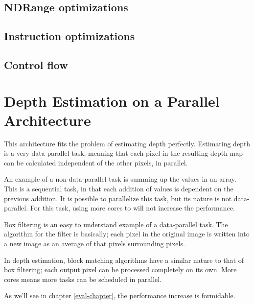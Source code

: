 \subsection{NDRange optimizations}
\label{sect:ndrange-optimization}



\subsection{Instruction optimizations}
\label{sect:instruction-optimization}

\subsection{Control flow}
\label{sect:control-flow}

\section{Depth Estimation on a Parallel Architecture}

This architecture fits the problem of estimating depth perfectly.
Estimating depth is a very data-parallel task, meaning that each pixel
in the resulting depth map can be calculated independent of the other
pixels, in parallel.

An example of a non-data-parallel task is summing up the values in an
array. This is a sequential task, in that each addition of values is
dependent on the previous addition. It is possible to parallelize this
task, but its nature is not data-parallel. For this task, using more
cores to will not increase the performance.

Box filtering is an easy to understand example of a data-parallel
task. The algorithm for the filter is basically; each pixel in the
original image is written into a new image as an average of that
pixels surrounding pixels.

In depth estimation, block matching algorithms have a similar nature
to that of box filtering; each output pixel can be processed
completely on its own. More cores means more tasks can be scheduled in
parallel.

As we'll see in chapter \ref{eval-chapter}, the performance increase
is formidable.
